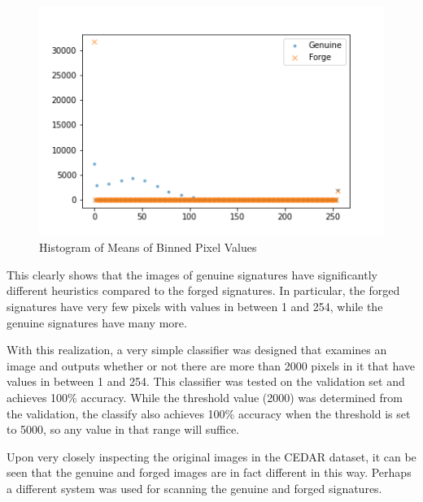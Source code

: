 \begin{figure}[h]
    \begin{center}
        \includegraphics[width=0.8\linewidth]{mean_hist.png}
    \end{center}
    \caption{Histogram of Means of Binned Pixel Values}
    \label{fig:hist_pixel_values}
\end{figure}

This clearly shows that the images of genuine signatures have significantly different heuristics compared to the forged signatures.
In particular, the forged signatures have very few pixels with values in between 1 and 254, while the genuine signatures have many more.

With this realization, a very simple classifier was designed that examines an image and outputs whether or not there are more than 2000 pixels in it that have values in between 1 and 254.
This classifier was tested on the validation set and achieves 100\% accuracy.
While the threshold value (2000) was determined from the validation, the classify also achieves 100\% accuracy when the threshold is set to 5000, so any value in that range will suffice.

Upon very closely inspecting the original images in the CEDAR dataset, it can be seen that the genuine and forged images are in fact different in this way.
Perhaps a different system was used for scanning the genuine and forged signatures.
